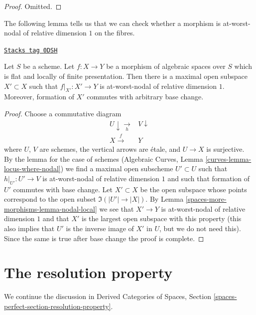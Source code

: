 \begin{proof}
Omitted.
\end{proof}

The following lemma tells us that we can check whether a morphism
is at-worst-nodal of relative dimension $1$ on the fibres.

\begin{lemma}
\label{spaces-more-morphisms-lemma-locus-where-nodal}
\href{https://stacks.math.columbia.edu/tag/0DSH}{\texttt{Stacks tag 0DSH}}

Let $S$ be a scheme.
Let $f : X \to Y$ be a morphism of algebraic spaces over $S$
which is flat and locally of finite presentation. Then there
is a maximal open subspace $X' \subset X$ such that $f|_{X'} : X' \to Y$
is at-worst-nodal of relative dimension $1$. Moreover, formation
of $X'$ commutes with arbitrary base change.
\end{lemma}

\begin{proof}
Choose a commutative diagram
$$
\begin{array}{cc}U \downarrow\underset{h}{\longrightarrow} & V \downarrow \\ X \overset{f}{\longrightarrow} & Y\end{array}
$$
where $U$, $V$ are schemes, the vertical arrows are \'etale, and
$U \to X$ is surjective. By the lemma for the case of schemes
(Algebraic Curves, Lemma \ref{curves-lemma-locus-where-nodal})
we find a maximal open subscheme $U' \subset U$
such that $h|_{U'} : U' \to V$ is at-worst-nodal of relative dimension $1$
and such that formation of $U'$ commutes with base change.
Let $X' \subset X$ be the open subspace whose points correspond
to the open subset $\Im(|U'| \to |X|)$.
By Lemma \ref{spaces-more-morphisms-lemma-nodal-local} we see that $X' \to Y$ is
at-worst-nodal of relative dimension $1$ and that $X'$ is the
largest open subspace with this property (this also implies
that $U'$ is the inverse image of $X'$ in $U$, but we do
not need this). Since the same is true after base change
the proof is complete.
\end{proof}

\section{The resolution property}
\label{spaces-more-morphisms-section-resolution-property}
We continue the discussion in Derived Categories of Spaces, Section
\ref{spaces-perfect-section-resolution-property}.

